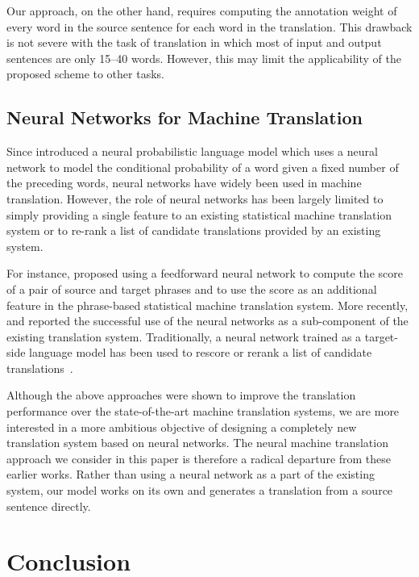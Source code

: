 \documentclass{article}
\begin{document}
Our approach, on the other hand, requires computing the annotation weight of
every word in the source sentence for each word in the translation. This
drawback is not severe with the task of translation in which most of input and
output sentences are only 15--40 words. However, this may limit the
applicability of the proposed scheme to other tasks.

\subsection{Neural Networks for Machine Translation}

Since \citet{Bengio2003lm} introduced a neural probabilistic language model
which uses a neural network to model the conditional probability of a word given
a fixed number of the preceding words, neural networks have widely been used in
machine translation. However, the role of neural networks has been largely
limited to simply providing a single feature to an existing statistical machine
translation system or to re-rank a list of candidate translations provided by an
existing system. 

For instance, \citet{Schwenk2012} proposed using a feedforward neural network to
compute the score of a pair of source and target phrases and to use the score as
an additional feature in the phrase-based statistical machine translation
system. More recently, \citet{Kalchbrenner2013} and \citet{Devlin2014} reported
the successful use of the neural networks as a sub-component of the existing
translation system. Traditionally, a neural network trained as a target-side
language model has been used to rescore or rerank a list of candidate
translations~\citep[see, e.g.,][]{Schwenk2006t}.

Although the above approaches were shown to improve the translation performance
over the state-of-the-art machine translation systems, we are more interested in
a more ambitious objective of designing a completely new translation system
based on neural networks. The neural machine translation approach we consider in
this paper is therefore a radical departure from these earlier works. Rather
than using a neural network as a part of the existing system, our model works on
its own and generates a translation from a source sentence directly.

\section{Conclusion}
\end{document}
